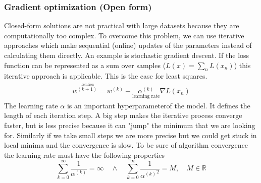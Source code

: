 \documentclass[../main.tex]{subfiles}
\begin{document}
\subsubsection{Gradient optimization (Open form)}
Closed-form solutions are not practical with large datasets because they are computationally too complex. To overcome this problem, we can use iterative approaches which make sequential (online) updates of the parameters instead of calculating them directly. An example is stochastic\footnotemark{} gradient descent.
If the loss function can be represented as a sum over samples ($L(x)=\sum_nL(x_n)$) this iterative approach is applicable. This is the case for least squares.
\begin{align}
    w^{\overset{\text{iteration}}{(k+1)}}=w^{(k)}-\underset{\text{learning rate}}{\alpha^{(k)}} \nabla L(x_n)
\end{align}
The learning rate $\alpha$ is an important hyperparameter\footnotemark {}of the model. It defines the length of each iteration step. A big step makes the iterative process converge faster, but is less precise because it can "jump" the minimum that we are looking for. Similarly if we take small steps we are more precise but we could get stuck in local minima and the convergence is slow. To be sure of algorithm convergence the learning rate must have the following properties
\begin{equation}
    \sum_{k=0}^{\infty}\frac{1}{\alpha^{(k)}}=\infty \quad \wedge \quad \sum_{k=0}^{\infty}\frac{1}{{\alpha^{(k)}}^2}=M, \quad M\in\mathbb{R}
\end{equation}
\end{document}
